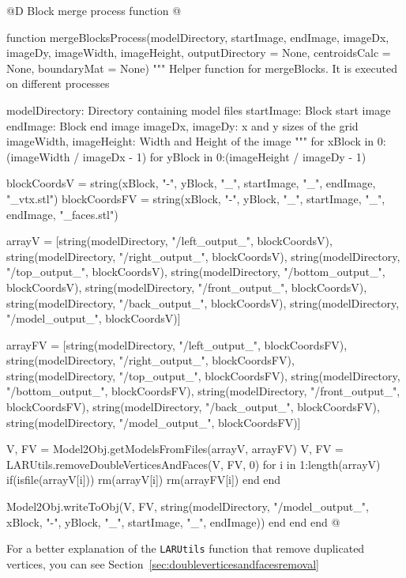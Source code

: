 \documentclass[11pt,oneside]{article}	%
\begin{document}
@D Block merge process function
@{function mergeBlocksProcess(modelDirectory,
			      startImage, endImage,
			      imageDx, imageDy,
			      imageWidth, imageHeight,
			      outputDirectory = None,
			      centroidsCalc = None, boundaryMat = None)
  """
  Helper function for mergeBlocks.
  It is executed on different processes

  modelDirectory: Directory containing model files
  startImage: Block start image
  endImage: Block end image
  imageDx, imageDy: x and y sizes of the grid
  imageWidth, imageHeight: Width and Height of the image
  """
  for xBlock in 0:(imageWidth / imageDx - 1)
    for yBlock in 0:(imageHeight / imageDy - 1)

      blockCoordsV = string(xBlock, "-", yBlock, "_", startImage,
			    "_", endImage, "_vtx.stl")
      blockCoordsFV = string(xBlock, "-", yBlock, "_", startImage,
			    "_", endImage, "_faces.stl")

      arrayV = [string(modelDirectory, "/left_output_", blockCoordsV),
                string(modelDirectory, "/right_output_", blockCoordsV),
                string(modelDirectory, "/top_output_", blockCoordsV),
                string(modelDirectory, "/bottom_output_", blockCoordsV),
                string(modelDirectory, "/front_output_", blockCoordsV),
                string(modelDirectory, "/back_output_", blockCoordsV),
                string(modelDirectory, "/model_output_", blockCoordsV)]

      arrayFV = [string(modelDirectory, "/left_output_", blockCoordsFV),
                 string(modelDirectory, "/right_output_", blockCoordsFV),
                 string(modelDirectory, "/top_output_", blockCoordsFV),
                 string(modelDirectory, "/bottom_output_", blockCoordsFV),
                 string(modelDirectory, "/front_output_", blockCoordsFV),
                 string(modelDirectory, "/back_output_", blockCoordsFV),
                 string(modelDirectory, "/model_output_", blockCoordsFV)]

      V, FV = Model2Obj.getModelsFromFiles(arrayV, arrayFV)
      V, FV = LARUtils.removeDoubleVerticesAndFaces(V, FV, 0)
      for i in 1:length(arrayV)
        if(isfile(arrayV[i]))
          rm(arrayV[i])
          rm(arrayFV[i])
        end
      end

      Model2Obj.writeToObj(V, FV, string(modelDirectory, "/model_output_",
                               xBlock, "-", yBlock, "_", startImage, "_", endImage))
    end
  end
end @}

For a better explanation of the \texttt{LARUtils} function that remove duplicated vertices, you can see Section~\ref{sec:doubleverticesandfacesremoval}
\end{document}

